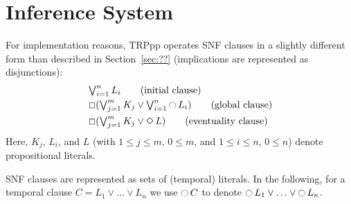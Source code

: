 \documentclass[11pt]{article}
\newcommand{\Next}[0]{\mathop{\ocircle}}
\newcommand{\Always}[0]{\mathop{\Box}}
\newcommand{\Sometimes}[0]{\mathop{\Diamond}}
\begin{document}
\section{Inference System}
For implementation reasons, TRPpp operates SNF clauses in a slightly different
form than described in Section~\ref{sec:??} (implications are represented as
disjunctions): 
\begin{align}
 & \textstyle\bigvee_{i=1}^n L_i
\tag{initial clause}\\
&\textstyle\Always(\bigvee_{j=1}^m K_j \lor
\textstyle\bigvee_{i=1}^n \Next L_i)\tag{global clause}\\
&\textstyle\Always(\bigvee_{j=1}^m K_j \lor \Sometimes L)
\tag{eventuality clause}%
\end{align}
Here, $K_j$, $L_i$, and $L$ (with $1\leq j\leq m$, $0\leq m$, and
$1\leq i\leq n$, $0\leq n$) denote propositional literals.

SNF clauses are represented as sets of (temporal) literals. 
In the following, for a temporal clause $C=L_1\lor\ldots\lor L_n$ we use $\Next
C$ to denote $\Next{L_1}\lor\ldots\lor\Next{L_n}$.  
\end{document}
